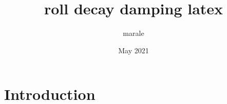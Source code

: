 \documentclass{article}
\title{roll decay damping latex}
\author{marale }
\date{May 2021}
\begin{document}
\maketitle

\section{Introduction}
\end{document}
